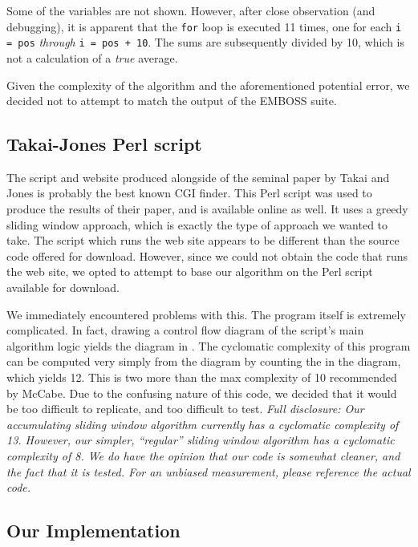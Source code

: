\documentclass{bioinfo}
\begin{document}
Some of the variables are not shown. However, after close observation
(and debugging), it is apparent that the \verb|for| loop is executed
11 times, one for each \verb|i = pos| \emph{through}
\verb|i = pos + 10|. The sums are subsequently divided by 10, which is
not a calculation of a \emph{true} average.

Given the complexity of the algorithm and the aforementioned potential
error, we decided not to attempt to match the output of the EMBOSS
suite.

\subsection{Takai-Jones Perl script}

The script and website produced alongside of the seminal paper by
Takai and Jones is probably the best known CGI finder. This Perl
script was used to produce the results of their paper, and is
available online as well. It uses a greedy sliding window approach,
which is exactly the type of approach we wanted to take. The script
which runs the web site appears to be different than the source code
offered for download. However, since we could not obtain the code that
runs the web site, we opted to attempt to base our algorithm on the
Perl script available for download.

We immediately encountered problems with this. The program itself is
extremely complicated. In fact, drawing a control flow diagram of the
script's main algorithm logic yields the diagram in
. The cyclomatic complexity of this program
can be computed very simply from the diagram by counting the
 in the diagram, which yields 12. This
is two more than the max complexity of 10 recommended by McCabe. Due
to the confusing nature of this code, we decided that it would be too
difficult to replicate, and too difficult to test. \textit{Full
  disclosure: Our accumulating sliding window algorithm currently has
  a cyclomatic complexity of 13. However, our simpler, ``regular''
  sliding window algorithm has a cyclomatic complexity of 8. We do
  have the opinion that our code is somewhat cleaner, and the fact
  that it is tested. For an unbiased measurement, please reference the
  actual code.}

\subsection{Our Implementation}
\end{document}
